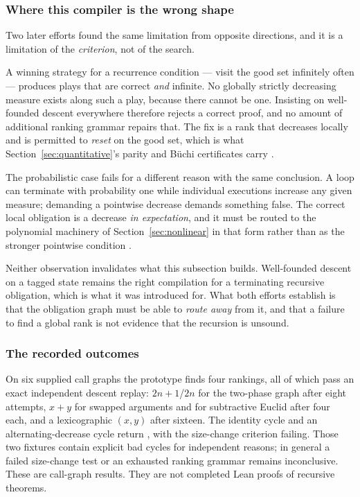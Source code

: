 \subsubsection*{Where this compiler is the wrong shape}

Two later efforts found the same limitation from opposite directions, and it is
a limitation of the \emph{criterion}, not of the search.

A winning strategy for a recurrence condition --- visit the good set infinitely
often --- produces plays that are correct \emph{and} infinite. No globally
strictly decreasing measure exists along such a play, because there cannot be
one. Insisting on well-founded descent everywhere therefore rejects a correct
proof, and no amount of additional ranking grammar repairs that. The fix is a
rank that decreases locally and is permitted to \emph{reset} on the good set,
which is what Section~\ref{sec:quantitative}'s parity and B\"uchi certificates
carry .

The probabilistic case fails for a different reason with the same conclusion. A
loop can terminate with probability one while individual executions increase
any given measure; demanding a pointwise decrease demands something false. The
correct local obligation is a decrease \emph{in expectation}, and it must be
routed to the polynomial machinery of Section~\ref{sec:nonlinear} in that form
rather than as the stronger pointwise condition .

Neither observation invalidates what this subsection builds. Well-founded
descent on a tagged state remains the right compilation for a terminating
recursive obligation, which is what it was introduced for. What both efforts
establish is that the obligation graph must be able to \emph{route away} from
it, and that a failure to find a global rank is not evidence that the recursion
is unsound.

\subsubsection*{The recorded outcomes}

On six supplied call graphs the prototype finds four rankings, all of which pass
an exact independent descent replay: $2n+1$/$2n$ for the two-phase graph after
eight attempts, $x+y$ for swapped arguments and for subtractive Euclid after
four each, and a lexicographic $(x,y)$ after sixteen. The identity cycle and an
alternating-decrease cycle return \unknown{}, with the size-change criterion
failing. Those two fixtures contain explicit bad cycles for independent reasons;
in general a failed size-change test or an exhausted ranking grammar remains
inconclusive. These are call-graph results. They are not completed Lean proofs
of recursive theorems.

